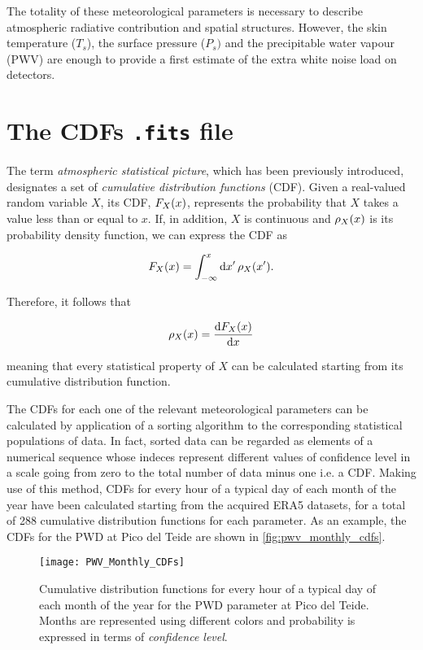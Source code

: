 The totality of these meteorological parameters is necessary to describe
atmospheric radiative contribution and spatial structures. However, the
skin temperature ($T_s$), the surface pressure ($P_s)$ and the precipitable
water vapour (PWV) are enough to provide a first estimate of the extra
white noise load on detectors.

\section{The CDFs \texttt{.fits} file}\label{s:CDF_fits_file}

The term \emph{atmospheric statistical picture}, which has been previously
introduced, designates a set of \emph{cumulative distribution functions} (CDF).
Given a real-valued random variable $X$, its CDF, $F_X\qty(x)$, represents the
probability that $X$ takes a value less than or equal to $x$.
If, in addition, $X$ is continuous and $\rho_X\qty(x)$ is its probability density
function, we can express the CDF as

\begin{equation}
        F_X\qty(x) = \int^x_{-\infty}\dd{x'} \rho_X\qty(x').
\end{equation}

Therefore, it follows that

\begin{equation}
        \rho_X\qty(x) = \dv{F_X\qty(x)}{x}
\end{equation}

meaning that every statistical property of $X$ can be calculated starting
from its cumulative distribution function.

The CDFs for each one of the relevant meteorological parameters can be
calculated by application of a sorting algorithm to the corresponding
statistical populations of data. In fact, sorted data can be regarded as
elements of a numerical sequence whose indeces represent different values
of confidence level in a scale going from zero to the total number of data
minus one i.e.  a CDF.  Making use of this method, CDFs for every hour of a
typical day of each month of the year have been calculated starting from
the acquired ERA5 datasets, for a total of \num{288} cumulative
distribution functions for each parameter.  As an example, the CDFs for the
PWD at Pico del Teide are shown in \autoref{fig:pwv_monthly_cdfs}.

\begin{figure}
        \centering
        \texttt{[image: PWV\_Monthly\_CDFs]}
        \caption{Cumulative distribution functions for every hour of a
        typical day of each month of the year for the PWD parameter at Pico
        del Teide. Months are represented using different colors and
        probability is expressed in terms of \emph{confidence level}.}
        \label{fig:pwv_monthly_cdfs}
\end{figure}

